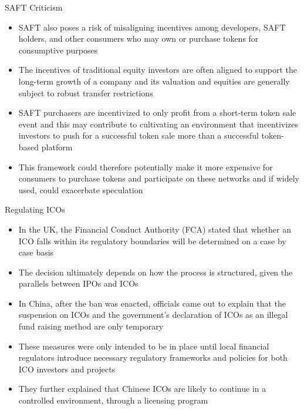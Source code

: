 \documentclass[11pt]{beamer}
\begin{document}

\begin{frame}{SAFT Criticism}
	\begin{itemize}
		\item SAFT also poses a risk of misaligning incentives among developers, SAFT holders, and other consumers who may own or purchase tokens for consumptive purposes
		\item The incentives of traditional equity investors are often aligned to support the long-term growth of a company and its valuation and equities are generally subject to robust transfer restrictions
		\item SAFT purchasers are incentivized to only profit from a short-term token sale event and this may contribute to cultivating an environment that incentivizes investors to push for a successful token sale more than a successful token-based platform
		\item This framework could therefore potentially make it more expensive for consumers to purchase tokens and participate on these networks and if widely used, could exacerbate speculation
	\end{itemize}
\end{frame}


\begin{frame}{Regulating ICOs}
	\begin{itemize}
		\item In the UK, the Financial Conduct Authority (FCA) stated that whether an ICO falls within its regulatory boundaries will be determined on a case by case basis
		\item The decision ultimately depends on how the process is structured, given the parallels between IPOs and ICOs
		\item In China, after the ban was enacted, officials came out to explain that the suspension on ICOs and the government's declaration of ICOs as an illegal fund raising method are only temporary
		\item These measures were only intended to be in place until local financial regulators introduce necessary regulatory frameworks and policies for both ICO investors and projects
		\item They further explained that Chinese ICOs are likely to continue in a controlled environment, through a licensing program
	\end{itemize}
\end{frame}
\end{document}
